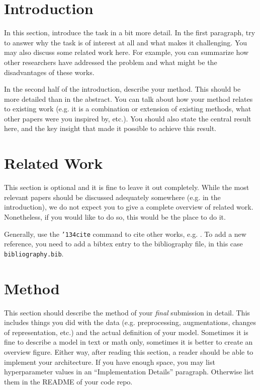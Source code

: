 \section{Introduction}
In this section, introduce the task in a bit more detail. In the first paragraph, try to answer why the task is of interest at all and what makes it challenging. You may also discuss some related work here. For example, you can summarize how other researchers have addressed the problem and what might be the disadvantages of these works.

In the second half of the introduction, describe your method. This should be more detailed than in the abstract. You can talk about how your method relates to existing work (e.g. it is a combination or extension of existing methods, what other papers were you inspired by, etc.). You should also state the central result here, and the key insight that made it possible to achieve this result.

\section{Related Work}
This section is optional and it is fine to leave it out completely. While the most relevant papers should be discussed adequately somewhere (e.g. in the introduction), we do not expect you to give a complete overview of related work. Nonetheless, if you would like to do so, this would be the place to do it.

Generally, use the \texttt{{\char'134}cite} command to cite other works, e.g. \cite{Douglass98,Harel79}. To add a new reference, you need to add a bibtex entry to the bibliography file, in this case \texttt{bibliography.bib}.

\section{Method}
This section should describe the method of your \emph{final} submission in detail. This includes things you did with the data (e.g. preprocessing, augmentations, changes of representation, etc.) and the actual definition of your model. Sometimes it is fine to describe a model in text or math only, sometimes it is better to create an overview figure. Either way, after reading this section, a reader should be able to implement your architecture.
If you have enough space, you may list hyperparameter values in an ``Implementation Details'' paragraph. Otherwise list them in the README of your code repo.


